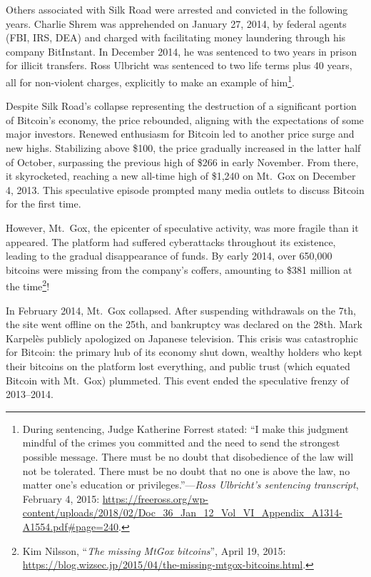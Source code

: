 \documentclass[
  a5paper,
  smalldemyvopaper,10pt,twoside,onecolumn,openright,extrafontsizes,hidelinks]{memoir}
\begin{document}
Others associated with Silk Road were arrested and convicted in the
following years. Charlie Shrem was apprehended on January 27, 2014, by
federal agents (FBI, IRS, DEA) and charged with facilitating money
laundering through his company BitInstant. In December 2014, he was
sentenced to two years in prison for illicit transfers. Ross Ulbricht
was sentenced to two life terms plus 40 years, all for non-violent
charges, explicitly to make an example of him\footnote{During
  sentencing, Judge Katherine Forrest stated: ``I make this judgment
  mindful of the crimes you committed and the need to send the strongest
  possible message. There must be no doubt that disobedience of the law
  will not be tolerated. There must be no doubt that no one is above the
  law, no matter one's education or privileges.''---\emph{Ross
  Ulbricht's sentencing transcript}, February 4, 2015:
  \url{https://freeross.org/wp-content/uploads/2018/02/Doc_36_Jan_12_Vol_VI_Appendix_A1314-A1554.pdf\#page=240}.}.

Despite Silk Road's collapse representing the destruction of a
significant portion of Bitcoin's economy, the price rebounded, aligning
with the expectations of some major investors. Renewed enthusiasm for
Bitcoin led to another price surge and new highs. Stabilizing above
\$100, the price gradually increased in the latter half of October,
surpassing the previous high of \$266 in early November. From there, it
skyrocketed, reaching a new all-time high of \$1,240 on Mt.~Gox on
December 4, 2013. This speculative episode prompted many media outlets
to discuss Bitcoin for the first time.

However, Mt.~Gox, the epicenter of speculative activity, was more
fragile than it appeared. The platform had suffered cyberattacks
throughout its existence, leading to the gradual disappearance of funds.
By early 2014, over 650,000 bitcoins were missing from the company's
coffers, amounting to \$381 million at the time\footnote{Kim Nilsson,
  ``\emph{The missing MtGox bitcoins}'', April 19, 2015:
  \url{https://blog.wizsec.jp/2015/04/the-missing-mtgox-bitcoins.html}.}!

In February 2014, Mt.~Gox collapsed. After suspending withdrawals on the
7th, the site went offline on the 25th, and bankruptcy was declared on
the 28th. Mark Karpelès publicly apologized on Japanese television. This
crisis was catastrophic for Bitcoin: the primary hub of its economy shut
down, wealthy holders who kept their bitcoins on the platform lost
everything, and public trust (which equated Bitcoin with Mt.~Gox)
plummeted. This event ended the speculative frenzy of 2013--2014.
\end{document}
